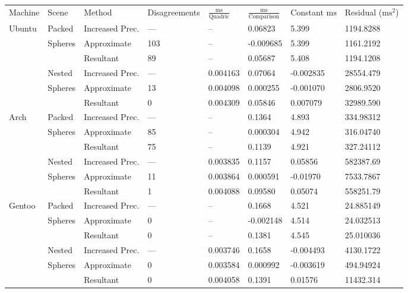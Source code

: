 \begin{tabular}{|l|l|ll|lll|l|}
\hline
Machine & Scene & Method & Disagreements & $\frac{\text{ms}}{\text{Quadric}}$ & $\frac{\text{ms}}{\text{Comparison}}$ & Constant $\text{ms}$ & Residual ($\text{ms}^2$)\\
\hhline{|=|=|==|===|=|}
Ubuntu & Packed & Increased Prec. & \hphantom{1}--- & -- & \hphantom{-}0.06823 & \hphantom{-}5.399 & 1194.8288\\
& Spheres & Approximate & 103 & -- & -0.009685 & \hphantom{-}5.399 & 1161.2192\\
&& Resultant & \hphantom{1}89 & -- & \hphantom{-}0.05687 & \hphantom{-}5.408 & 1194.1208\\
\hline
& Nested & Increased Prec. & \hphantom{1}--- & 0.004163 & \hphantom{-}0.07064 & -0.002835 & 28554.479\\
& Spheres & Approximate & \hphantom{1}13 & 0.004098 & \hphantom{-}0.000255 & -0.001070 & \hphantom{2}2806.9520\\
&& Resultant & \hphantom{10}0 & 0.004309 & \hphantom{-}0.05846 & \hphantom{-}0.007079 & 32989.590\\
\hline
Arch & Packed & Increased Prec. & \hphantom{1}--- & -- & \hphantom{-}0.1364 & \hphantom{-}4.893 & 334.98312\\
& Spheres & Approximate & \hphantom{1}85 & -- & \hphantom{-}0.000304 & \hphantom{-}4.942 & 316.04740\\
&& Resultant & \hphantom{1}75 & -- & \hphantom{-}0.1139 & \hphantom{-}4.921 & 327.24112\\
\hline
& Nested & Increased Prec. & \hphantom{1}--- & 0.003835 & \hphantom{-}0.1157 & \hphantom{-}0.05856 & 582387.69\\
& Spheres & Approximate & \hphantom{1}11 & 0.003864 & \hphantom{-}0.000591 & -0.01970 & 7533.7867\\
&& Resultant & \hphantom{10}1 & 0.004088 & \hphantom{-}0.09580 & \hphantom{-}0.05074 & 558251.79\\
\hline
Gentoo & Packed & Increased Prec. & \hphantom{1}--- & -- & \hphantom{-}0.1668 & \hphantom{-}4.521 & 24.885149\\
& Spheres & Approximate & \hphantom{10}0 & -- & -0.002148 & \hphantom{-}4.514 & 24.032513\\
&& Resultant & \hphantom{10}0 & -- & \hphantom{-}0.1381 & \hphantom{-}4.545 & 25.010036\\
\hline
& Nested & Increased Prec. & \hphantom{1}--- & 0.003746 & \hphantom{-}0.1658 & -0.004493 & 4130.1722\\
& Spheres & Approximate & \hphantom{10}0 & 0.003584 & \hphantom{-}0.000992 & -0.003619 & \hphantom{4}494.94924\\
&& Resultant & \hphantom{10}0 & 0.004058 & \hphantom{-}0.1391 & \hphantom{-}0.01576 & 11432.314\\
\hline
\end{tabular}
